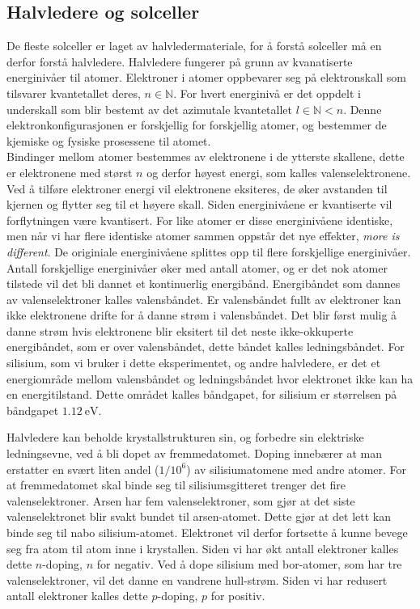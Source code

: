 \documentclass[%
 reprint,
 amsmath,amssymb,
 aps,
 norsk,
 booktabs
]{revtex4-1}
\begin{document}
\subsection{Halvledere og solceller}
De fleste solceller er laget av halvledermateriale, for å forstå solceller må en derfor forstå halvledere. Halvledere fungerer på grunn av kvanatiserte energinivåer til atomer. Elektroner i atomer oppbevarer seg på elektronskall som tilsvarer kvantetallet deres, $n\in\mathbb{N}$. For hvert energinivå er det oppdelt i underskall som blir bestemt av det azimutale kvantetallet $l \in \mathbb{N} < n$. Denne elektronkonfigurasjonen er forskjellig for forskjellig atomer, og bestemmer de kjemiske og fysiske prosessene til atomet.\\
Bindinger mellom atomer bestemmes av elektronene i de ytterste skallene, dette er elektronene med størst $n$ og derfor høyest energi, som kalles valenselektronene. Ved å tilføre elektroner energi vil elektronene eksiteres, de øker avstanden til kjernen og flytter seg til et høyere skall. Siden energinivåene er kvantiserte vil forflytningen være kvantisert. For like atomer er disse energinivåene identiske, men når vi har flere identiske atomer sammen oppstår det nye effekter, \textit{more is different}. De originiale energinivåene splittes opp til flere forskjellige energinivåer. Antall forskjellige energinivåer øker med antall atomer, og er det nok atomer tilstede vil det bli dannet et kontinuerlig energibånd. Energibåndet som dannes av valenselektroner kalles valensbåndet. Er valensbåndet fullt av elektroner kan ikke elektronene drifte for å danne strøm i valensbåndet. Det blir først mulig å danne strøm hvis elektronene blir eksitert til det neste ikke-okkuperte energibåndet, som er over valensbåndet, dette båndet kalles ledningsbåndet. For silisium, som vi bruker i dette eksperimentet, og andre halvledere, er det et energiområde mellom valensbåndet og ledningsbåndet hvor elektronet ikke kan ha en energitilstand. Dette området kalles båndgapet, for silisium er størrelsen på båndgapet $\SI{1.12}{\electronvolt}$.\par
Halvledere kan beholde krystallstrukturen sin, og forbedre sin elektriske ledningsevne, ved å bli dopet av fremmedatomet. Doping innebærer at man erstatter en svært liten andel ($1/10^6$) av silisiumatomene med andre atomer. For at fremmedatomet skal binde seg til silisiumsgitteret trenger det fire valenselektroner. Arsen har fem valenselektroner, som gjør at det siste valenselektronet blir svakt bundet til arsen-atomet. Dette gjør at det lett kan binde seg til nabo silisium-atomet. Elektronet vil derfor fortsette å kunne bevege seg fra atom til atom inne i krystallen. Siden vi har økt antall elektroner kalles dette $n$-doping, $n$ for negativ. Ved å dope silisium med bor-atomer, som har tre valenselektroner, vil det danne en vandrene hull-strøm. Siden vi har redusert antall elektroner kalles dette $p$-doping, $p$ for positiv.\\
\end{document}
